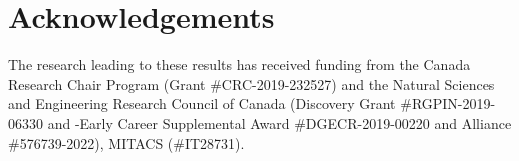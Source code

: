 \section{Acknowledgements}

The research leading to these results has received funding from the Canada Research Chair Program (Grant \#CRC-2019-232527) and the Natural Sciences and Engineering Research Council of Canada (Discovery Grant \#RGPIN-2019-06330 and -Early Career Supplemental Award \#DGECR-2019-00220  and Alliance \#576739-2022), MITACS (\#IT28731).
